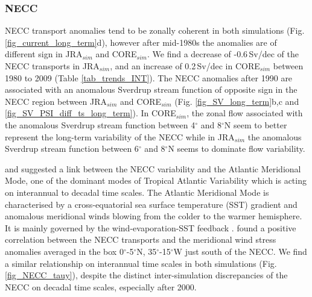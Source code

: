 \documentclass[os, manuscript]{copernicus}
\begin{document}
\subsubsection{NECC}
NECC transport anomalies tend to be zonally coherent in both simulations (Fig. \ref{fig_current_long_term}d), however after mid-1980s the anomalies are of different sign in JRA$_{sim}$ and CORE$_{sim}$. We find a decrease of -0.6$\,$Sv/dec of the NECC transports in JRA$_{sim}$, and an increase of 0.2$\,$Sv/dec in CORE$_{sim}$ between 1980 to 2009 (Table \ref{tab_trends_INT}). The NECC anomalies after 1990 are associated with an anomalous Sverdrup stream function of opposite sign in the NECC region between JRA$_{sim}$ and CORE$_{sim}$ (Fig. \ref{fig_SV_long_term}b,c and \ref{fig_SV_PSI_diff_ts_long_term}). In CORE$_{sim}$, the zonal flow associated with the anomalous Sverdrup stream function between 4$^{\circ}$ and 8$^{\circ}$N seem to better represent the long-term variability of the NECC while in JRA$_{sim}$ the anomalous Sverdrup stream function between 6$^{\circ}$ and 8$^{\circ}$N seems to dominate flow variability.

\cite{Goes2013} and \cite{Hormann2012} suggested a link between the NECC variability and the Atlantic Meridional Mode, one of the dominant modes of Tropical Atlantic Variability which is acting on interannual to decadal time scales. The Atlantic Meridional Mode is characterised by a cross-equatorial sea surface temperature (SST) gradient and anomalous meridional winds blowing from the colder to the warmer hemisphere. It is mainly governed by the wind-evaporation-SST feedback \citep{Carton1996a,Chang1997}. \cite{Goes2013} found a positive correlation between the NECC transports and the meridional wind stress anomalies averaged in the box 0$^{\circ}$-5$^{\circ}$N, 35$^{\circ}$-15$^{\circ}$W just south of the NECC. We find a similar relationship on interannual time scales in both simulations (Fig. \ref{fig_NECC_tauy}), despite the distinct inter-simulation discrepancies of the NECC on decadal time scales, especially after 2000.
\end{document}
